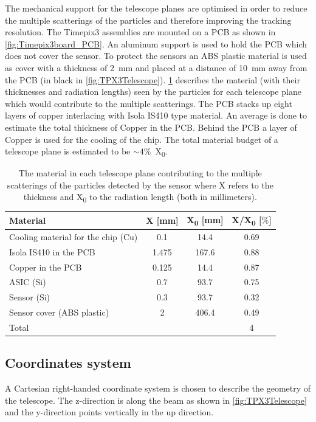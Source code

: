 The mechanical support for the telescope planes are optimised in order
to reduce the multiple scatterings of the particles and therefore
improving the tracking resolution. The Timepix3 assemblies are mounted
on a PCB as shown in \cref{fig:Timepix3board_PCB}. An aluminum support
is used to hold the PCB which does not cover the sensor. To protect
the sensors an ABS plastic material is used as cover with a thickness
of 2~mm and placed at a distance of 10~mm away from the PCB (in black
in \cref{fig:TPX3Telescope}). \cref{tab:TPX3TelescopeMaterial}
describes the material (with their thicknesses and radiation lengths)
seen by the particles for each telescope plane which would contribute
to the multiple scatterings. The PCB stacks up eight layers of copper
interlacing with Isola IS410 type material. An average is done to
estimate the total thickness of Copper in the PCB. Behind the PCB a
layer of Copper is used for the cooling of the chip. The total
material budget of a telescope plane is estimated to be
$\sim4\%$~X\textsubscript{0}.

\begin{table}[htbp]
  \centering
  \caption{The material in each telescope plane contributing to the
    multiple scatterings of the particles detected by the sensor where
    X refers to the thickness and X\textsubscript{0} to the radiation
    length (both in millimeters).}
  \label{tab:TPX3TelescopeMaterial}
  \begin{tabular}{l c c c}
    \toprule
    Material & X [mm] & X\textsubscript{0} [mm] & X/X\textsubscript{0} [$\%$] \\
    \midrule
    Cooling material for the chip (Cu) & 0.1 & 14.4 & 0.69 \\
    Isola IS410 in the PCB & 1.475 & 167.6 & 0.88 \\
    Copper in the PCB & 0.125 & 14.4 & 0.87 \\
    ASIC (Si) & 0.7 & 93.7 & 0.75\\
    Sensor (Si) & 0.3 & 93.7 & 0.32\\ 
    Sensor cover (ABS plastic) & 2 & 406.4 & 0.49 \\ \hline
    Total & & & 4 \\
    \bottomrule
  \end{tabular}
\end{table}

\subsection{Coordinates system}
A Cartesian right-handed coordinate system is chosen to describe the
geometry of the telescope. The z-direction is along the beam as shown
in \cref{fig:TPX3Telescope} and the y-direction points vertically in
the up direction.

